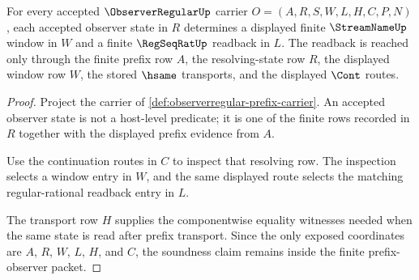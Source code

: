 \begin{theorem}
\label{thm:observerregular-resolving-window-soundness}
For every accepted $\ObserverRegularUp$ carrier $O=(A,R,S,W,L,H,C,P,N)$, each accepted observer state in $R$ determines a displayed finite $\StreamNameUp$ window in $W$ and a finite $\RegSeqRatUp$ readback in $L$. The readback is reached only through the finite prefix row $A$, the resolving-state row $R$, the displayed window row $W$, the stored $\hsame$ transports, and the displayed $\Cont$ routes.
\end{theorem}
\begin{proof}
Project the carrier of \autoref{def:observerregular-prefix-carrier}. An accepted observer state is not a host-level predicate; it is one of the finite rows recorded in $R$ together with the displayed prefix evidence from $A$.

Use the continuation routes in $C$ to inspect that resolving row. The inspection selects a window entry in $W$, and the same displayed route selects the matching regular-rational readback entry in $L$.

The transport row $H$ supplies the componentwise equality witnesses needed when the same state is read after prefix transport. Since the only exposed coordinates are $A$, $R$, $W$, $L$, $H$, and $C$, the soundness claim remains inside the finite prefix-observer packet.
\end{proof}

